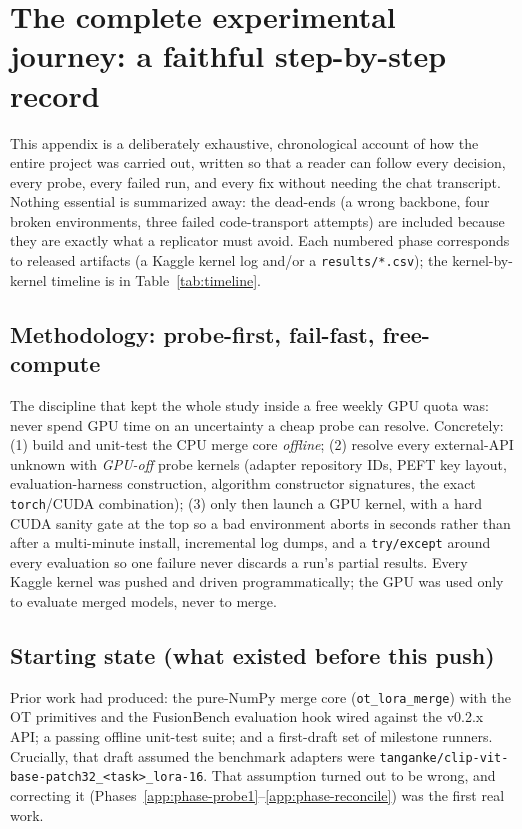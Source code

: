 \documentclass[11pt]{article}
\begin{document}
\clearpage
\appendix

\section{The complete experimental journey: a faithful step-by-step record}
\label{app:journey}
This appendix is a deliberately exhaustive, chronological account of how the entire project was carried
out, written so that a reader can follow every decision, every probe, every failed run, and every fix
without needing the chat transcript. Nothing essential is summarized away: the dead-ends (a wrong
backbone, four broken environments, three failed code-transport attempts) are included because they are
exactly what a replicator must avoid. Each numbered phase corresponds to released artifacts (a Kaggle
kernel log and/or a \texttt{results/*.csv}); the kernel-by-kernel timeline is in
Table~\ref{tab:timeline}.

\subsection{Methodology: probe-first, fail-fast, free-compute}
\label{app:method-meta}
The discipline that kept the whole study inside a free weekly GPU quota was: never spend GPU time on an
uncertainty a cheap probe can resolve. Concretely: (1) build and unit-test the CPU merge core
\emph{offline}; (2) resolve every external-API unknown with \emph{GPU-off} probe kernels (adapter
repository IDs, PEFT key layout, evaluation-harness construction, algorithm constructor signatures, the
exact \texttt{torch}/CUDA combination); (3) only then launch a GPU kernel, with a hard CUDA sanity gate at
the top so a bad environment aborts in seconds rather than after a multi-minute install, incremental log
dumps, and a \texttt{try/except} around every evaluation so one failure never discards a run's partial
results. Every Kaggle kernel was pushed and driven programmatically; the GPU was used only to evaluate
merged models, never to merge.

\subsection{Starting state (what existed before this push)}
Prior work had produced: the pure-NumPy merge core (\texttt{ot\_lora\_merge}) with the OT primitives and
the FusionBench evaluation hook wired against the v0.2.x API; a passing offline unit-test suite; and a
first-draft set of milestone runners. Crucially, that draft assumed the benchmark adapters were
\texttt{tanganke/clip-vit-base-patch32\_<task>\_lora-16}. That assumption turned out to be wrong, and
correcting it (Phases~\ref{app:phase-probe1}--\ref{app:phase-reconcile}) was the first real work.
\end{document}
